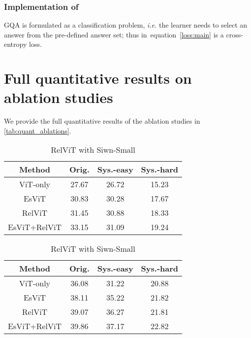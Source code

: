 \documentclass{article} \usepackage{iclr2022_conference,times}
\def\eqref#1{equation~\ref{#1}}
\begin{document}
\subsubsection{Implementation of }

GQA is formulated as a classification problem, \emph{i.e.} the learner needs to select an answer from the pre-defined answer set; thus  in~\eqref{loss:main} is a cross-entropy loss.

\section{Full quantitative results on ablation studies}
We provide the full quantitative results of the ablation studies in \autoref{tab:quant_ablations}.

\begin{table}[h]
    \centering
    \setlength\tabcolsep{3pt}
    \begin{subtable}[t]{0.49\textwidth}
        \centering
    \begin{tabular}{cccc}
    \toprule
         Method & Orig.& Sys.-easy & Sys.-hard  \\
    \midrule
         ViT-only &27.67 &26.72 &15.23 \\
         EsViT &30.83 &30.28 &17.67 \\
         RelViT &31.45 &30.88 &18.33 \\
         EsViT+RelViT &33.15 &31.09 &19.24 \\
    \bottomrule
    \end{tabular}
    \caption{RelViT with ViT-S/16}
    \label{tab:quant_a}
    \end{subtable}
    \hfill
    \setlength\tabcolsep{3pt}
    \begin{subtable}[t]{0.49\textwidth}
        \centering
    \begin{tabular}{cccc}
    \toprule
         Method & Orig. &Sys.-easy & Sys.-hard  \\
    \midrule
         ViT-only &36.08 &31.22 &20.88 \\
         EsViT &38.11 &35.22 &21.82 \\
         RelViT &39.07 &36.27 &21.81 \\
         EsViT+RelViT &39.86 &37.17 &22.82 \\
    \bottomrule
    \end{tabular}
    \caption{RelViT with Siwn-Small}
    \label{tab:quant_b}
    \end{subtable}
    \vfill
    \setlength\tabcolsep{3pt}

\end{table}
\end{document}
